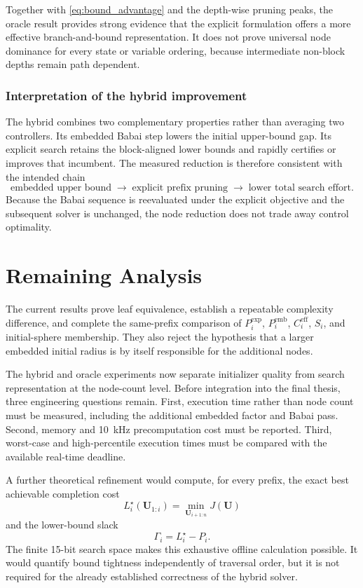 \documentclass[paper=a4,oneside,fontsize=12pt,DIV=14,headings=normal,parskip=half,headsepline,numbers=noendperiod]{scrreprt}
\newcommand{\vct}[1]{\bm{#1}}
\begin{document}
Together with \cref{eq:bound_advantage} and the depth-wise pruning peaks, the
oracle result provides strong evidence that the explicit formulation offers a
more effective branch-and-bound representation.  It does not prove universal
node dominance for every state or variable ordering, because intermediate
non-block depths remain path dependent.

\subsection{Interpretation of the hybrid improvement}
The hybrid combines two complementary properties rather than averaging two
controllers.  Its embedded Babai step lowers the initial upper-bound gap.  Its
explicit search retains the block-aligned lower bounds and rapidly certifies or
improves that incumbent.  The measured reduction is therefore consistent with
the intended chain
\begin{equation}
 \text{embedded upper bound}
 \;\longrightarrow\;
 \text{explicit prefix pruning}
 \;\longrightarrow\;
 \text{lower total search effort}.
\end{equation}
Because the Babai sequence is reevaluated under the explicit objective and the
subsequent solver is unchanged, the node reduction does not trade away control
optimality.

\chapter{Remaining Analysis}

The current results prove leaf equivalence, establish a repeatable complexity
difference, and complete the same-prefix comparison of
$P_i^{\mathrm{exp}}$, $P_i^{\mathrm{emb}}$, $C_i^{\mathrm{eff}}$, $S_i$, and
initial-sphere membership.  They also reject the hypothesis that a larger
embedded initial radius is by itself responsible for the additional nodes.

The hybrid and oracle experiments now separate initializer quality from search
representation at the node-count level.  Before integration into the final
thesis, three engineering questions remain.  First, execution time rather than
node count must be measured, including the additional embedded factor and
Babai pass.  Second, memory and 10~kHz precomputation cost must be reported.
Third, worst-case and high-percentile execution times must be compared with the
available real-time deadline.

A further theoretical refinement would compute, for every prefix, the exact
best achievable completion cost
\begin{equation}
 L_i^\star(\vct U_{1:i})
 =\min_{\vct U_{i+1:n}}J(\vct U)
\end{equation}
and the lower-bound slack
\begin{equation}
 \Gamma_i=L_i^\star-P_i.
\end{equation}
The finite 15-bit search space makes this exhaustive offline calculation
possible.  It would quantify bound tightness independently of traversal order,
but it is not required for the already established correctness of the hybrid
solver.
\end{document}

